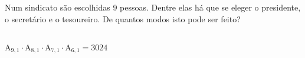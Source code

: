 \begin{ex}
Num sindicato são escolhidas 9 pessoas. Dentre elas há que se eleger o presidente, o secretário e o tesoureiro. De quantos modos isto pode ser feito?
 \begin{sol}
   \phantom{A} \\
   $\mathrm{A}_{9,1}\cdot\mathrm{A}_{8,1}\cdot\mathrm{A}_{7,1}\cdot\mathrm{A}_{6,1}= 3024$
 \end{sol}
\end{ex}